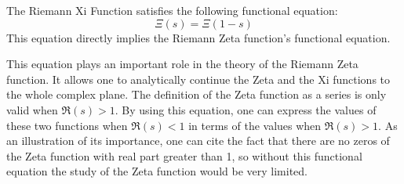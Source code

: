 \documentclass[12pt]{article}
\begin{document}
The Riemann Xi Function satisfies the following functional equation:
 $$\Xi(s) = \Xi(1-s)$$
This equation  directly implies the Riemann Zeta function's functional equation. 

This equation plays an important role in the theory of the Riemann Zeta function.  It allows one to analytically continue the Zeta and the Xi functions to the whole complex plane.  The definition of the Zeta function as a series is only valid when $\Re(s) > 1$.  By using this equation, one can express the values of these two functions when $\Re(s) < 1$ in terms of the values when $\Re(s) > 1$.  As an illustration of its importance, one can cite the fact that there are no zeros of the Zeta function with real part greater than 1, so without this functional equation the study of the Zeta function would be very limited.
\end{document}
